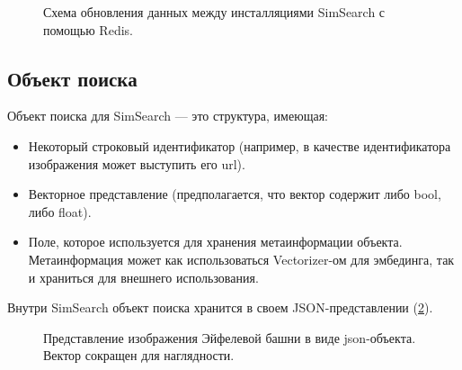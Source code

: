 \documentclass[a4paper,12pt]{extarticle}
\begin{document}
\begin{center}
\begin{figure}[H]
\caption{Схема обновления данных между инсталляциями SimSearch с помощью Redis.}
\label{ris:scaling}
\end{figure}
\end{center}

\subsection{Объект поиска}

Объект поиска для SimSearch --- это структура, имеющая:
\begin{itemize}
\item Некоторый строковый идентификатор (например, в качестве идентификатора изображения может выступить его url).
\item Векторное представление (предполагается, что вектор содержит либо bool, либо float).
\item Поле, которое используется для хранения метаинформации объекта. \\ Метаинформация может как использоваться Vectorizer-ом для эмбединга, так и храниться для внешнего использования.
\end{itemize}


Внутри SimSearch объект поиска хранится в своем JSON-представлении (\cref{ris:json_eufel}).

\begin{center}
\begin{figure}[H]
\caption{Представление изображения Эйфелевой башни \cite{parispic} в виде json-объекта. Вектор сокращен для наглядности.}
\label{ris:json_eufel}
\end{figure}
\end{center}
\end{document}

